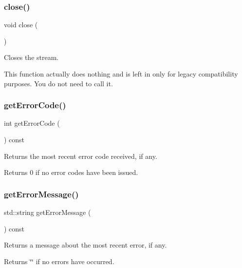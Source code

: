 \subsubsection{\texorpdfstring{close()}{close()}}
{\footnotesize\ttfamily void close (\begin{DoxyParamCaption}{ }\end{DoxyParamCaption})}



Closes the stream. 

This function actually does nothing and is left in only for legacy compatibility purposes. You do not need to call it. \mbox{\label{classiurlstream_a9e79924a3e50273b08ab5b3a8c12a221}} 
\subsubsection{\texorpdfstring{get\+Error\+Code()}{getErrorCode()}}
{\footnotesize\ttfamily int get\+Error\+Code (\begin{DoxyParamCaption}{ }\end{DoxyParamCaption}) const}



Returns the most recent error code received, if any. 

Returns 0 if no error codes have been issued. \mbox{\label{classiurlstream_adf0cc934eff26878cdf2018259997a4a}} 
\subsubsection{\texorpdfstring{get\+Error\+Message()}{getErrorMessage()}}
{\footnotesize\ttfamily std\+::string get\+Error\+Message (\begin{DoxyParamCaption}{ }\end{DoxyParamCaption}) const}



Returns a message about the most recent error, if any. 

Returns \char`\"{}\char`\"{} if no errors have occurred. \mbox{\label{classiurlstream_a736d777b29179f52ba753317d84b1087}} 

